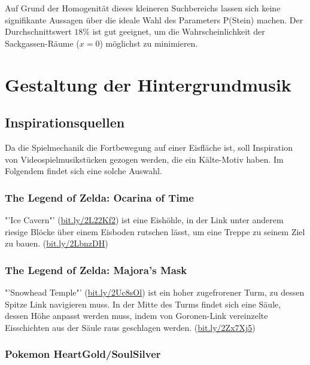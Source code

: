 \documentclass[a4paper,10pt,ngerman]{scrartcl}
\begin{document}
			Auf Grund der Homogenität dieses kleineren Suchbereichs lassen sich keine signifikante Aussagen über die ideale Wahl des Parameters P(Stein) machen. Der Durchschnittswert \( 18 \% \) ist gut geeignet, um die Wahrscheinlichkeit der Sackgassen-Räume (\( x  = 0 \)) möglichst zu minimieren.


	\newpage
	\section{Gestaltung der Hintergrundmusik}
	
		\subsection{Inspirationsquellen}
		
			Da die Spielmechanik die Fortbewegung auf einer Eisfläche ist, soll Inspiration von Videospielmusikstücken gezogen werden, die ein Kälte-Motiv haben. Im Folgendem findet sich eine solche Auswahl.
			
			\subsubsection{The Legend of Zelda: Ocarina of Time}
			
				"'Ice Cavern"' (\href{https://youtube.com/watch?v=bcXuwXKsqMY}{bit.ly/2L22Kf2}) ist eine Eishöhle, in der Link unter anderem riesige Blöcke über einem Eisboden rutschen lässt, um eine Treppe zu seinem Ziel zu bauen. (\href{https://youtube.com/watch?v=uaGb3PtSPDg}{bit.ly/2LbnzDH})
			
			
			\subsubsection{The Legend of Zelda: Majora's Mask}
			
				"'Snowhead Temple"' (\href{https://youtube.com/watch?v=uxPDVDpbskI}{bit.ly/2Uc8sOl}) ist ein hoher zugefrorener Turm, zu dessen Spitze Link navigieren muss. In der Mitte des Turms findet sich eine Säule, dessen Höhe anpasst werden muss, indem von Goronen-Link vereinzelte Eisschichten aus der Säule raus geschlagen werden. (\href{https://youtube.com/watch?v=yM8440G32gk}{bit.ly/2Zx7Xj5})
			
			
			\subsubsection{Pokemon HeartGold/SoulSilver}
			
\end{document}
